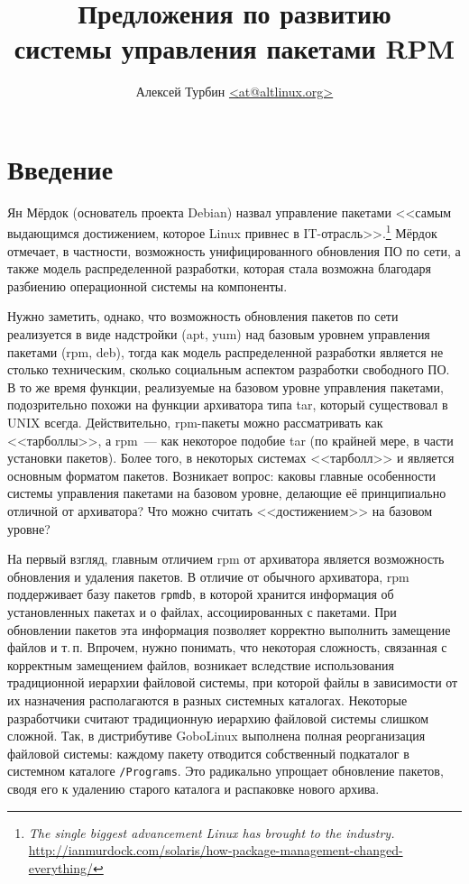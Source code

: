 \documentclass[russian,a4paper,12pt,titlepage]{article}
\begin{document}
\title{Предложения по развитию\\системы управления пакетами RPM}
\author{Алексей Турбин \url{<at@altlinux.org>}}
\maketitle
\tableofcontents
\pagebreak[4]

\section*{Введение}
Ян Мёрдок (основатель проекта Debian) назвал управление пакетами <<самым
выдающимся достижением, которое Linux привнес в IT-отрасль>>.\footnote{\textit{The
single biggest advancement Linux has brought to the industry.}
\url{http://ianmurdock.com/solaris/how-package-management-changed-everything/}}
Мёрдок отмечает, в частности, возможность унифицированного обновления ПО по сети,
а также модель распределенной разработки, которая стала возможна благодаря разбиению
операционной системы на компоненты.

Нужно заметить, однако, что возможность обновления пакетов по сети
реализуется в виде надстройки (apt, yum) над базовым уровнем управления пакетами
(rpm, deb), тогда как модель распределенной разработки является не столько техническим,
сколько социальным аспектом разработки свободного ПО.  В то же время функции, реализуемые
на базовом уровне управления пакетами, подозрительно похожи на функции архиватора типа tar,
который существовал в UNIX всегда.
Действительно, rpm-пакеты можно рассматривать как <<тарболлы>>, а rpm~--- как
некоторое подобие tar (по крайней мере, в части установки пакетов).  Более того,
в некоторых системах <<тарболл>> и является основным форматом пакетов.  Возникает
вопрос: каковы главные особенности системы управления пакетами на базовом уровне,
делающие её принципиально отличной от архиватора?  Что можно считать
<<достижением>> на базовом уровне?

На первый взгляд, главным отличием rpm от архиватора является возможность обновления и удаления пакетов.
В отличие от обычного архиватора, rpm поддерживает базу пакетов \verb|rpmdb|, в которой хранится информация
об установленных пакетах и о файлах, ассоциированных с пакетами.  При обновлении пакетов эта информация
позволяет корректно выполнить замещение файлов и т.\,п.  Впрочем, нужно понимать, что некоторая сложность,
связанная с корректным замещением файлов, возникает вследствие использования традиционной иерархии файловой
системы, при которой файлы в зависимости от их назначения располагаются в разных системных каталогах.
Некоторые разработчики считают традиционную иерархию файловой системы слишком сложной.
Так, в дистрибутиве GoboLinux выполнена полная реорганизация файловой системы: каждому пакету отводится
собственный подкаталог в системном каталоге \verb|/Programs|.  Это радикально упрощает обновление пакетов,
сводя его к удалению старого каталога и распаковке нового архива.
\end{document}
